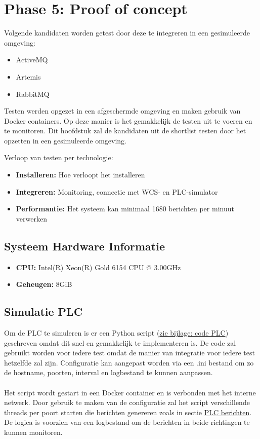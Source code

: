 \section{Phase 5: Proof of concept}
Volgende kandidaten worden getest door deze te integreren in een gesimuleerde omgeving:
\begin{itemize}
  \item ActiveMQ
  \item Artemis
  \item RabbitMQ
\end{itemize}

Testen werden opgezet in een afgeschermde omgeving en maken gebruik van Docker containers.
Op deze manier is het gemakkelijk de testen uit te voeren en te monitoren.
Dit hoofdstuk zal de kandidaten uit de shortlist testen door het opzetten in een gesimuleerde omgeving.
\newpage

Verloop van testen per technologie:
\begin{itemize}
  \item \textbf{Installeren:} Hoe verloopt het installeren
  \item \textbf{Integreren:} Monitoring, connectie met WCS- en PLC-simulator
  \item \textbf{Performantie:} Het systeem kan minimaal 1680 berichten per minuut verwerken
\end{itemize}

\subsection{Systeem Hardware Informatie}
\begin{itemize}
    \item \textbf{CPU:} Intel(R) Xeon(R) Gold 6154 CPU @ 3.00GHz
    \item \textbf{Geheugen:} 8GiB
\end{itemize}

\subsection{Simulatie PLC}
Om de PLC te simuleren is er een Python script (\hyperref[sec:code_plc]{zie bijlage: code PLC}) geschreven omdat dit snel en gemakkelijk te implementeren is.
De code zal gebruikt worden voor iedere test omdat de manier van integratie voor iedere test hetzelfde zal zijn.
Configuratie kan aangepast worden via een .ini bestand om zo de hostname, poorten, interval en logbestand te kunnen aanpassen.
\\\\
Het script wordt gestart in een Docker container en is verbonden met het interne netwerk.
Door gebruik te maken van de configuratie zal het script verschillende threads per poort starten die berichten genereren
zoals in sectie \hyperref[listing:message_example]{PLC berichten}.
De logica is voorzien van een logbestand om de berichten in beide richtingen te kunnen monitoren.

